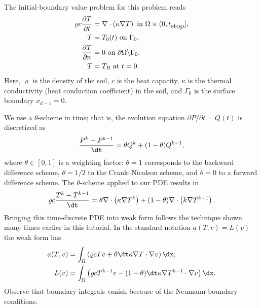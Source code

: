The initial-boundary value problem for this problem reads
\begin{align}
\varrho c \frac{\partial T}{\partial t}
    &= \nabla\cdot\left( \kappa\nabla T\right)\hbox{ in }\Omega\times (0,t_{\hbox{stop}}],
\\
T &= T_0(t)\hbox{ on }\Gamma_0,
\\
\frac{\partial T}{\partial n} &= 0\hbox{ on }\partial\Omega\backslash\Gamma_0,
\\
T &= T_R\hbox{ at }t =0.
\end{align}
Here, $\varrho$ is the density of the soil, $c$ is the heat capacity,
$\kappa$ is the thermal conductivity (heat conduction coefficient)
in the soil, and $\Gamma_0$ is the surface boundary $x_{d-1}=0$.

We use a $\theta$-scheme in time; that is, the evolution equation
$\partial P/\partial t=Q(t)$ is discretized as
\begin{equation}
   \frac{P^k - P^{k-1}}{\dt} = \theta Q^k + (1-\theta )Q^{k-1},
\end{equation}
where $\theta\in[0,1]$ is a weighting factor: $\theta =1$
corresponds to the backward difference scheme, $\theta =1/2$ to the
Crank--Nicolson scheme, and $\theta =0$ to a forward difference scheme.
The $\theta$-scheme applied to our PDE results in
\begin{equation}
\varrho c \frac{T^k-T^{k-1}}{\dt} =
\theta \nabla\cdot\left( \kappa\nabla T^k\right)
+ (1-\theta) \nabla\cdot\left( k\nabla T^{k-1}\right).
\end{equation}
Bringing this time-discrete PDE into weak form follows the technique
shown many times earlier in this tutorial. In the standard notation
$a(T,v)=L(v)$ the weak form has
\begin{align}
a(T,v) &= \int_\Omega
\left( \varrho c Tv + \theta{\dt} \kappa\nabla T\cdot \nabla v\right)\dx,
\\
L(v) &= \int_\Omega \left( \varrho c T^{k-1}v - (1-\theta){\dt}
\kappa\nabla T^{k-1}\cdot \nabla v\right)\dx.
\end{align}
Observe that boundary integrals vanish because of the Neumann boundary
conditions.

